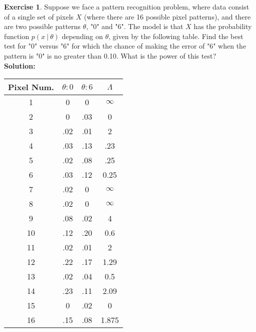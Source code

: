 \documentclass[11pt]{article}
\theoremstyle{definition}
\newtheorem{exercise}[theorem]{Exercise}
\newcommand{\st}{\ |\ }
\newcommand{\V}{\vspace{0.3cm}\\}
\newcommand{\sol}{\V \textbf{Solution:} \V}
\begin{document}
\begin{exercise} Suppose we face a pattern recognition problem, where data consist of a single set of pixels $X$ (where there are 16 possible pixel patterns), and there are two possible patterns $\theta$, "0" and "6". The model is that $X$ has the probability function $p(x \st \theta)$ depending on $\theta$, given by the following table. Find the best test for "0" versus "6" for which the chance of making the error of "6" when the pattern is "0" is no greater than 0.10. What is the power of this test? \sol
\begin{center}
\begin{tabular}{ |c|c|c|c|} 
 \hline
 Pixel Num. & $\theta: 0$ & $\theta: 6$ & $\Lambda$ \\
 \hline
 1 & 0 & 0 &  $\infty$ \\ 
 2 & 0 & .03 & 0 \\ 
 3 & .02 & .01 & 2 \\ 
4 & .03 & .13 & .23 \\ 
 5 & .02 & .08 & .25 \\ 
 6 & .03 & .12 & 0.25 \\ 
 7 & .02 & 0 & $\infty$ \\ 
 8 & .02 & 0 & $\infty$ \\ 
 9 & .08 & .02 & 4 \\ 
 10 & .12 & .20 & 0.6 \\
 11 & .02 & .01 & 2 \\ 
 12 & .22 & .17 & 1.29 \\
 13 & .02 & .04 & 0.5 \\ 
 14 & .23 & .11 & 2.09 \\
 15 & 0 & .02 & 0 \\ 
 16 & .15 & .08 & 1.875 \\  
 \hline
\end{tabular}
\end{center}
\newpage


\end{exercise}
\end{document}
